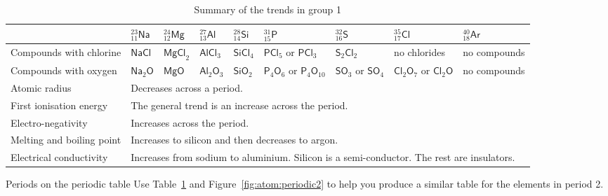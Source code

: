 \begin{table}[H]
 \begin{center}
  \begin{tabular}{|p{2cm}|p{1.5cm}|p{1.5cm}|p{1.5cm}|p{1.5cm}|p{1.5cm}|p{1.5cm}|p{1.5cm}|p{1.5cm}|} \hline
 & $^{23}_{11}\mathsf{Na}$ & $^{24}_{12}\mathsf{Mg}$ &  $^{27}_{13}\mathsf{Al}$ & $^{28}_{14}\mathsf{Si}$ &  $^{31}_{15}\mathsf{P}$ & $^{32}_{16}\mathsf{S}$ & $^{35}_{17}\mathsf{Cl}$ & $^{40}_{18}\mathsf{Ar}$\\ \hline
   Compounds with chlorine & $\mathsf{NaCl}$ & $\mathsf{MgCl}_2$ & $\mathsf{AlCl}_{3}$ & $\mathsf{SiCl}_{4}$ & $\mathsf{PCl}_{5}$ or $\mathsf{PCl}_{3}$ & $\mathsf{S}_{2}\mathsf{Cl}_{2}$ & no chlorides & no compounds \\ \hline
Compounds with oxygen & $\mathsf{Na}_{2}\mathsf{O}$ & $\mathsf{MgO}$ & $\mathsf{Al}_{2}\mathsf{O}_{3}$ & $\mathsf{SiO}_{2}$ & $\mathsf{P}_{4}\mathsf{O}_{6}$ or $\mathsf{P}_{4}\mathsf{O}_{10}$ & $\mathsf{SO}_{3}$ or $\mathsf{SO}_{4}$ & $\mathsf{Cl}_{2}\mathsf{O}_{7}$ or $\mathsf{Cl}_{2}\mathsf{O}$ & no compounds \\ \hline
Atomic radius & \multicolumn{8}{p{8cm}|}{Decreases across a period.} \\ \hline
First ionisation energy & \multicolumn{8}{p{8cm}|}{The general trend is an increase across the period.} \\ \hline
Electro-negativity & \multicolumn{8}{p{8cm}|}{Increases across the period.} \\ \hline
Melting and boiling point & \multicolumn{8}{p{8cm}|}{Increases to silicon and then decreases to argon.} \\ \hline
Electrical conductivity & \multicolumn{8}{p{10cm}|}{Increases from sodium to aluminium. Silicon is a semi-conductor. The rest are insulators.} \\ \hline
  \end{tabular}
\caption{Summary of the trends in group 1}
\label{tab:period3trends}
 \end{center}

\end{table}
\begin{exercises}{Periods on the periodic table}
Use Table~\ref{tab:period3trends} and Figure~\ref{fig:atom:periodic2} to help you produce a similar table for the elements in period 2.	
\end{exercises}
